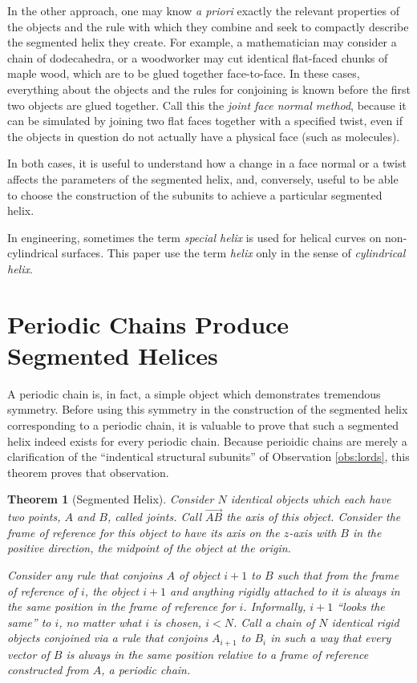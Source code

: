 \documentclass[11pt]{article}
\newtheorem{theorem}{Theorem}
\begin{document}
{In the other approach, one may know {\it a priori} exactly the
relevant properties of the objects and the rule with which they combine
and seek to compactly describe the segmented helix they create.
For example, a mathematician may consider a chain of dodecahedra,
or a woodworker may cut identical flat-faced chunks of maple wood,
which are to be glued together face-to-face.
In these cases, everything about the objects and the rules for conjoining
is known before the first two objects are glued together.
Call this the {\em joint face normal method}, because
it can be simulated by joining two flat faces together with a specified twist,
even if the objects in question
do not actually have a physical face (such as molecules).

In both cases, it is useful to understand how a change in a face normal
or a twist affects the parameters
of the segmented helix,
and, conversely, useful to be able to choose the construction
of the subunits to achieve a particular segmented helix.

In engineering, sometimes the term {\em special helix}\cite{gu2012research}
is used for helical curves on non-cylindrical surfaces.
This paper use the term {\em helix} only in the
sense of {\em cylindrical helix}.

\section{Periodic Chains Produce Segmented Helices}

A periodic chain is, in fact, a simple object which demonstrates tremendous symmetry.
Before using this symmetry in the construction of the segmented helix corresponding to a periodic chain,
it is valuable to
prove that such a segmented helix indeed exists for every periodic chain.
Because perioidic chains are merely a clarification of the ``indentical structural subunits''
of Observation \ref{obs:lords},
this theorem proves that observation.

\begin{theorem}[Segmented Helix]
  \label{thm:helix}
  Consider $N$ identical objects which each have two points, $A$ and $B$, called {\em joints}. Call
  $\overrightarrow{AB}$ the {\em axis} of this object.
  Consider the frame of reference for this object to have
  its axis on the $z$-axis with $B$ in the positive direction, the
  midpoint of the object at the origin.

  Consider any rule that conjoins $A$ of object $i+1$ to $B$ such that
  from the frame of reference of $i$, the object $i+1$ and anything rigidly
  attached to it is always in the same position in the frame of reference for $i$.
  Informally, $i+1$ ``looks the same'' to $i$, no matter what $i$ is chosen, $i < N$.
  Call a chain of $N$ identical rigid objects conjoined via a rule that
  conjoins $A_{i+1}$ to $B_i$ in such a way that every vector
  of $B$ is always in the same position relative to a frame of reference
  constructed from $A$, a {\em periodic chain.}


\end{theorem}}
\end{document}
